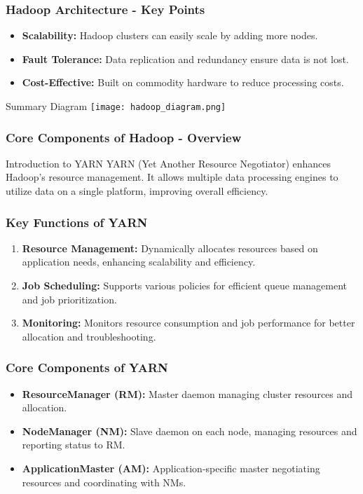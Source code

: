 \documentclass{beamer}
\begin{document}
\begin{frame}[fragile]
    \frametitle{Hadoop Architecture - Key Points}
    \begin{itemize}
        \item \textbf{Scalability:} Hadoop clusters can easily scale by adding more nodes.
        \item \textbf{Fault Tolerance:} Data replication and redundancy ensure data is not lost.
        \item \textbf{Cost-Effective:} Built on commodity hardware to reduce processing costs.
    \end{itemize}
    \begin{block}{Summary Diagram}
    \centering
    \texttt{[image: hadoop\_diagram.png]}
    \end{block}
\end{frame}

\begin{frame}[fragile]
    \frametitle{Core Components of Hadoop - Overview}
    \begin{block}{Introduction to YARN}
        YARN (Yet Another Resource Negotiator) enhances Hadoop's resource management.
        It allows multiple data processing engines to utilize data on a single platform, improving overall efficiency.
    \end{block}
\end{frame}

\begin{frame}[fragile]
    \frametitle{Key Functions of YARN}
    \begin{enumerate}
        \item \textbf{Resource Management:} Dynamically allocates resources based on application needs, enhancing scalability and efficiency.
        \item \textbf{Job Scheduling:} Supports various policies for efficient queue management and job prioritization.
        \item \textbf{Monitoring:} Monitors resource consumption and job performance for better allocation and troubleshooting.
    \end{enumerate}
\end{frame}

\begin{frame}[fragile]
    \frametitle{Core Components of YARN}
    \begin{itemize}
        \item \textbf{ResourceManager (RM):} Master daemon managing cluster resources and allocation.
        \item \textbf{NodeManager (NM):} Slave daemon on each node, managing resources and reporting status to RM.
        \item \textbf{ApplicationMaster (AM):} Application-specific master negotiating resources and coordinating with NMs.
    \end{itemize}
\end{frame}
\end{document}
